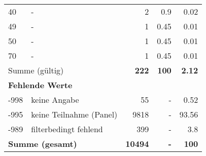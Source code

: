 \begin{longtable}{lXrrr}
     40 &
     \multicolumn{1}{X}{ -  } &


       \num{2} &
       \num[round-mode=places,round-precision=2]{0.9} &
         \num[round-mode=places,round-precision=2]{0.02} \\

     49 &
     \multicolumn{1}{X}{ -  } &


       \num{1} &
       \num[round-mode=places,round-precision=2]{0.45} &
         \num[round-mode=places,round-precision=2]{0.01} \\

     50 &
     \multicolumn{1}{X}{ -  } &


       \num{1} &
       \num[round-mode=places,round-precision=2]{0.45} &
         \num[round-mode=places,round-precision=2]{0.01} \\

     70 &
     \multicolumn{1}{X}{ -  } &


       \num{1} &
       \num[round-mode=places,round-precision=2]{0.45} &
         \num[round-mode=places,round-precision=2]{0.01} \\
     \midrule
     \multicolumn{2}{l}{Summe (gültig)} &
       \textbf{\num{222}} &
     \textbf{\num{100}} &
       \textbf{\num[round-mode=places,round-precision=2]{2.12}} \\
     \multicolumn{5}{l}{\textbf{Fehlende Werte}}\\
       -998 &
       keine Angabe &
         \num{55} &
        - &
         \num[round-mode=places,round-precision=2]{0.52} \\
       -995 &
       keine Teilnahme (Panel) &
         \num{9818} &
        - &
         \num[round-mode=places,round-precision=2]{93.56} \\
       -989 &
       filterbedingt fehlend &
         \num{399} &
        - &
         \num[round-mode=places,round-precision=2]{3.8} \\
     \midrule
     \multicolumn{2}{l}{\textbf{Summe (gesamt)}} &
          \textbf{\num{10494}} &
        \textbf{-} &
        \textbf{\num{100}} \\
     \bottomrule
     \end{longtable}
     
